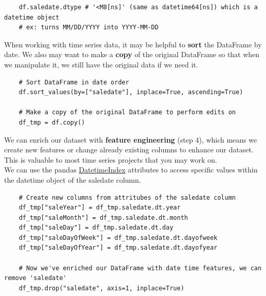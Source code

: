 \documentclass[11pt, a4paper]{article}
\begin{document}
\begin{spacing}{1.1}
\begin{lstlisting}
	df.saledate.dtype # '<M8[ns]' (same as datetime64[ns]) which is a datetime object
	# ex: turns MM/DD/YYYY into YYYY-MM-DD \end{lstlisting} \vspace*{1mm}
	When working with time series data, it may be helpful to \textbf{sort} the DataFrame by date. We also may want to make a \textbf{copy} of the original DataFrame so that when we manipulate it, we still have the original data if we need it. 
	\begin{lstlisting}
	# Sort DataFrame in date order
	df.sort_values(by=["saledate"], inplace=True, ascending=True)
	
	# Make a copy of the original DataFrame to perform edits on
	df_tmp = df.copy() \end{lstlisting} \vspace*{1mm}
	We can enrich our dataset with \textbf{feature engineering} (step 4), which means we create new features or change already existing columns to enhance our dataset. This is valuable to most time series projects that you may work on. \vspace*{1mm} \\
	We can use the pandas \href{https://pandas.pydata.org/pandas-docs/stable/reference/api/pandas.DatetimeIndex.html}{DatetimeIndex} attributes to access specific values within the datetime object of the saledate column.
	\begin{lstlisting}
	# Create new columns from attritubes of the saledate column
	df_tmp["saleYear"] = df_tmp.saledate.dt.year
	df_tmp["saleMonth"] = df_tmp.saledate.dt.month
	df_tmp["saleDay"] = df_tmp.saledate.dt.day
	df_tmp["saleDayOfWeek"] = df_tmp.saledate.dt.dayofweek
	df_tmp["saleDayOfYear"] = df_tmp.saledate.dt.dayofyear
	
	# Now we've enriched our DataFrame with date time features, we can remove 'saledate'
	df_tmp.drop("saledate", axis=1, inplace=True) \end{lstlisting} \vspace*{1mm}

\end{spacing}
\end{document}
